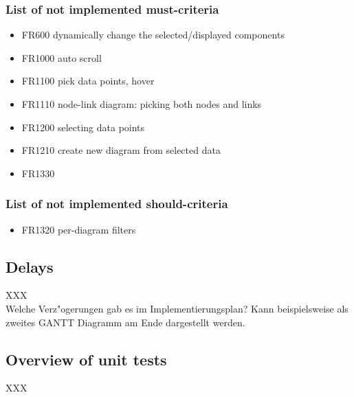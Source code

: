 \documentclass[oneside, english, final]{design}
\begin{document}
\subsubsection{List of not implemented must-criteria}
\begin{itemize}
  \item{FR600 dynamically change the selected/displayed components}
  \item{FR1000 auto scroll}
  \item{FR1100 pick data points, hover}
  \item{FR1110 node-link diagram: picking both nodes and links}
  \item{FR1200 selecting data points}
  \item{FR1210 create new diagram from selected data}
  \item{FR1330}
\end{itemize}


\subsubsection{List of not implemented should-criteria}
\begin{itemize}
\item{FR1320 per-diagram filters}
\end{itemize}


\subsection{Delays}
XXX
\\
Welche Verz"ogerungen gab es im Implementierungsplan? Kann beispielsweise als zweites
GANTT Diagramm am Ende dargestellt werden.
\subsection{Overview of unit tests}
XXX
\\
\end{document}
